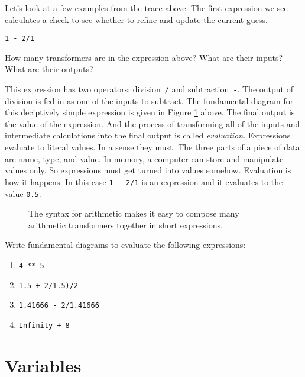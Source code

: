 Let's look at a few examples from the trace above. The first expression we see calculates a check to see whether to refine and update the current guess.

\begin{center}
  \texttt{1 - 2/1}
\end{center}

\begin{question}
  How many transformers are in the expression above? What are their inputs? What are their outputs?
\end{question}

This expression has two operators: division~\texttt{/} and subtraction~\texttt{-}. The output of division is fed in as one of the inputs to subtract. The fundamental diagram for this deciptively simple expression is given in Figure \ref{fig:intro-expression-fundamental-diagram} above. The final output is the value of the expression. And the process of transforming all of the inputs and intermediate calculations into the final output is called \emph{evaluation}. Expressions evaluate to literal values. In a sense they must. The three parts of a piece of data are name, type, and value. In memory, a computer can store and manipulate values only. So expressions must get turned into values somehow. Evaluation is how it happens. In this case \texttt{1 - 2/1} is an expression and it evaluates to the value \texttt{0.5}.

\begin{figure}
  
  \caption{\label{fig:intro-expression-fundamental-diagram} The syntax for arithmetic makes it easy to compose many arithmetic transformers together in short expressions.}
\end{figure}

\begin{question}
  Write fundamental diagrams to evaluate the following expressions:
  \begin{enumerate}
    \item \texttt{4 ** 5}
    \item \texttt{1.5 + 2/1.5)/2}
    \item \texttt{1.41666 - 2/1.41666}
    \item \texttt{Infinity + 8}
  \end{enumerate}
\end{question}

\section{Variables}

